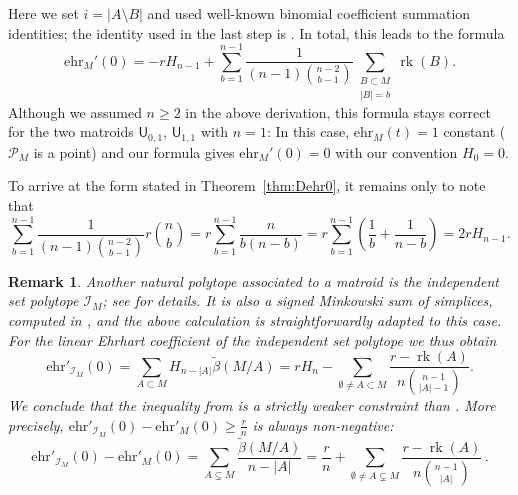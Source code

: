 \documentclass[pagesize,paper=A4,11pt,bibliography=totoc,oneside]{scrartcl}
\newtheorem{remark}[thm]{Remark}
\newcommand{\abs}[1]{\left|#1\right|}
\DeclareMathOperator{\rk}{rk}
\newcommand{\UM}[2]{\mathsf{U}_{#2,#1}} %
\newcommand{\MP}[1]{\mathscr{P}_{#1}} %
\newcommand{\IP}[1]{\mathcal{I}_{#1}} %
\newcommand{\ehr}{\mathrm{ehr}}
\newcommand{\HN}{H} %
\begin{document}
Here we set $i=\abs{A\setminus B}$ and used well-known binomial coefficient summation identities; the identity used in the last step is \cite[Corollary~2.2]{SuryWangZhao:ReciBin}. In total, this leads to the formula
\begin{equation*}
    \ehr_M'(0)=-r\HN_{n-1} + \sum_{b=1}^{n-1} \frac{1}{(n-1)\binom{n-2}{b-1}} \sum_{\substack{B\subset M\\\abs{B}=b}} \rk (B).
\end{equation*}
Although we assumed $n\geq2$ in the above derivation, this formula stays correct for the two matroids $\UM{1}{0}$, $\UM{1}{1}$ with $n=1$: In this case, $\ehr_M(t)=1$ constant ($\MP{M}$ is a point) and our formula gives $\ehr_M'(0)=0$ with our convention $\HN_0=0$.

To arrive at the form stated in Theorem~\ref{thm:Dehr0}, it remains only to note that
\begin{equation}\label{eq:simple-harmonic-sum}
    \sum_{b=1}^{n-1} \frac{1}{(n-1)\binom{n-2}{b-1}}  r\binom{n}{b}
    =r \sum_{b=1}^{n-1} \frac{n}{b(n-b)}
    =r \sum_{b=1}^{n-1} \left(\frac{1}{b} + \frac{1}{n-b}\right)
    =2r \HN_{n-1}.
\end{equation}
\begin{remark}
    Another natural polytope associated to a matroid is the independent set polytope $\IP{M}$; see \cite[\S4]{ArdilaBenedettiDoker:MatroidVolumes} for details. It is also a signed Minkowski sum of simplices, computed in \cite[Theorem~4.4]{ArdilaBenedettiDoker:MatroidVolumes}, and the above calculation is straightforwardly adapted to this case. For the linear Ehrhart coefficient of the independent set polytope we thus obtain
    \begin{equation}
        \ehr'_{\IP{M}}(0)
        =\sum_{A\subset M} \HN_{n-\abs{A}} \widetilde{\beta}(M/A)
        = r\HN_n - \sum_{\emptyset\neq A\subset M} \frac{r-\rk(A)}{n\binom{n-1}{\abs{A}-1}}.
    \end{equation}
    We conclude that the inequality from \cite[Corollary~4.12]{ArdilaBenedettiDoker:MatroidVolumes} is a strictly weaker constraint than \cite[Corollary~4.10]{ArdilaBenedettiDoker:MatroidVolumes}. More precisely, $\ehr'_{\IP{M}}(0)-\ehr'_M(0)\geq \frac{r}{n}$ is always non-negative:
    \begin{equation*}
        \ehr'_{\IP{M}}(0)-\ehr'_M(0)=\sum_{A\subsetneq M} \frac{\widetilde{\beta}(M/A)}{n-\abs{A}}
        = \frac{r}{n} + \sum_{\emptyset\neq A\subsetneq M} \frac{r-\rk(A)}{n\binom{n-1}{\abs{A}}}\,.
    \end{equation*}
\end{remark}
\end{document}
